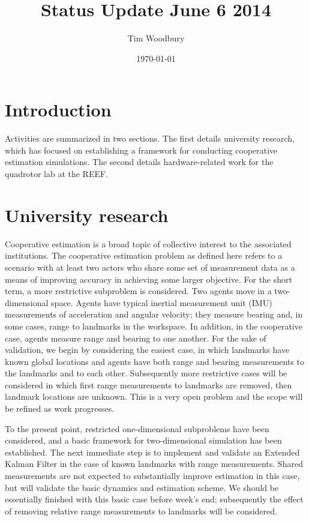 \documentclass{article}
\title{Status Update June 6 2014}
\author{Tim Woodbury}
\date{\today} %
\begin{document}
\maketitle

\section{Introduction}

Activities are summarized in two sections. The first details university research, which has focused on establishing a framework for conducting cooperative estimation simulations. The second details hardware-related work for the quadrotor lab at the REEF.

\section{University research}

Cooperative estimation is a broad topic of collective interest to the associated institutions. The cooperative estimation problem as defined here refers to a scenario with at least two actors who share some set of measurement data as a means of improving accuracy in achieving some larger objective. For the short term, a more restrictive subproblem is considered. Two agents move in a two-dimensional space. Agents have typical inertial measurement unit (IMU) measurements of acceleration and angular velocity; they measure bearing and, in some cases, range to landmarks in the workspace. In addition, in the cooperative case, agents measure range and bearing to one another. For the sake of validation, we begin by considering the easiest case, in which landmarks have known global locations and agents have both range and bearing measurements to the landmarks and to each other. Subsequently more restrictive cases will be considered in which first range measurements to landmarks are removed, then landmark locations are unknown. This is a very open problem and the scope will be refined as work progresses.

To the present point, restricted one-dimensional subproblems have been considered, and a basic framework for two-dimensional simulation has been established. The next immediate step is to implement and validate an Extended Kalman Filter in the case of known landmarks with range measurements. Shared measurements are not expected to substantially improve estimation in this case, but will validate the basic dynamics and estimation scheme. We should be essentially finished with this basic case before week's end; subsequently the effect of removing relative range measurements to landmarks will be considered. %
\end{document}
